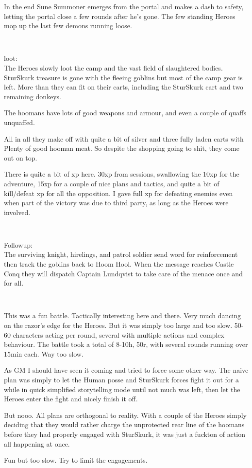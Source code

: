 In the end Sune Summoner emerges from the portal and makes a dash to safety, letting the portal close a few rounds after he's gone. The few standing Heroes mop up the last few demons running loose.

\

loot:\\
The Heroes slowly loot the camp and the vast field of slaughtered bodies. SturSkurk treasure is gone with the fleeing goblins but most of the camp gear is left. More than they can fit on their carts, including the SturSkurk cart and two remaining donkeys.

The hoomans have lots of good weapons and armour, and even a couple of quaffs unquaffed.

All in all they make off with quite a bit of silver and three fully laden carts with Plenty of good hooman meat. So despite the shopping going to shit, they come out on top.

There is quite a bit of xp here. 30xp from sessions, swallowing the 10xp for the adventure, 15xp for a couple of nice plans and tactics, and quite a bit of kill/defeat xp for all the opposition. I gave full xp for defeating enemies even when part of the victory was due to third party, as long as the Heroes were involved.

\

Followup:\\
The surviving knight, hirelings, and patrol soldier send word for reinforcement then track the goblins back to Hoom Hool. When the message reaches Castle Conq they will dispatch Captain Lundqvist to take care of the menace once and for all.

\

\begin{readoutloud}
This was a fun battle. Tactically interesting here and there. Very much dancing on the razor's edge for the Heroes. But it was simply too large and too slow. 50-60 characters acting per round, several with multiple actions and complex behaviour. The battle took a total of 8-10h, 50r, with several rounds running over 15min each. Way too slow.

As GM I should have seen it coming and tried to force some other way. The naive plan was simply to let the Human posse and SturSkurk forces fight it out for a while in quick simplified storytelling mode until not much was left, then let the Heroes enter the fight and nicely finish it off.

But nooo. All plans are orthogonal to reality. With a couple of the Heroes simply deciding that they would rather charge the unprotected rear line of the hoomans before they had properly engaged with SturSkurk, it was just a fuckton of action all happening at once.

Fun but too slow. Try to limit the engagements. 
\end{readoutloud}


